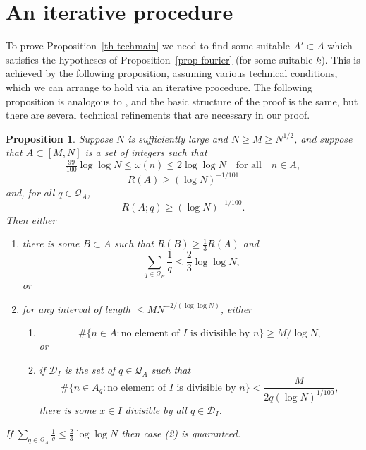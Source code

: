\documentclass{amsart}
\newtheorem{proposition}{Proposition}
\begin{document}
\section{An iterative procedure}
To prove Proposition~\ref{th-techmain} we need to find some suitable $A'\subset A$ which satisfies the hypotheses of Proposition~\ref{prop-fourier} (for some suitable $k$). This is achieved by the following proposition, assuming various technical conditions, which we can arrange to hold via an iterative procedure. The following proposition is analogous to \cite[Proposition 3]{Cr2003}, and the basic structure of the proof is the same, but there are several technical refinements that are necessary in our proof.

\begin{proposition}\label{prop-tech}
Suppose $N$ is sufficiently large and $N\geq M\geq N^{1/2}$, and suppose that $A\subset [M,N]$ is a set of integers such that
\[\tfrac{99}{100}\log\log N\leq \omega(n)\leq  2\log\log N\quad\textrm{for all}\quad n\in A,\]
\[R(A)\geq (\log N)^{-1/101}\]
and, for all $q\in \mathcal{Q}_A$,
\[R(A;q) \geq (\log N)^{-1/100}.\]
Then either
\begin{enumerate}
\item there is some $B\subset A$ such that $R(B)\geq \tfrac{1}{3}R(A)$ and 
\[\sum_{q\in \mathcal{Q}_{B}}\frac{1}{q}\leq \frac{2}{3}\log\log N,\]
or
\item for any interval of length $\leq MN^{-2/(\log \log N)}$, either
\begin{enumerate}
\item \[\# \{ n\in A : \textrm{no element of }I\textrm{ is divisible by }n\}\geq M/\log N,\]
or
\item if $\mathcal{D}_I$ is the set of $q\in\mathcal{Q}_A$ such that
\[\#\{ n\in A_q: \textrm{no element of }I\textrm{ is divisible by }n\}<\frac{M}{2q(\log N)^{1/100}},\]
there is some $x\in I$ divisible by all $q\in\mathcal{D}_I$.
\end{enumerate}
\end{enumerate}
If $\sum_{q\in\mathcal{Q}_A}\frac{1}{q}\leq \frac{2}{3}\log\log N$ then case (2) is guaranteed. 
\end{proposition}
\end{document}
